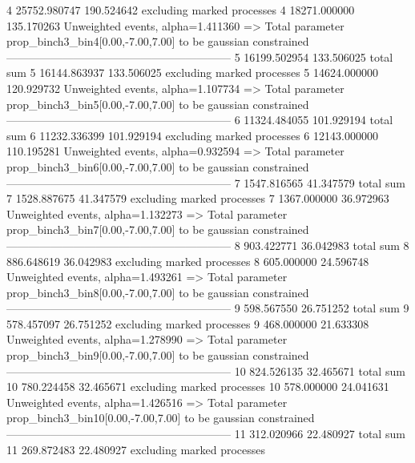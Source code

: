 4          25752.980747    190.524642      excluding marked processes    
4          18271.000000    135.170263      Unweighted events, alpha=1.411360
  => Total parameter prop_binch3_bin4[0.00,-7.00,7.00] to be gaussian constrained
------------------------------------------------------------
5          16199.502954    133.506025      total sum                     
5          16144.863937    133.506025      excluding marked processes    
5          14624.000000    120.929732      Unweighted events, alpha=1.107734
  => Total parameter prop_binch3_bin5[0.00,-7.00,7.00] to be gaussian constrained
------------------------------------------------------------
6          11324.484055    101.929194      total sum                     
6          11232.336399    101.929194      excluding marked processes    
6          12143.000000    110.195281      Unweighted events, alpha=0.932594
  => Total parameter prop_binch3_bin6[0.00,-7.00,7.00] to be gaussian constrained
------------------------------------------------------------
7          1547.816565     41.347579       total sum                     
7          1528.887675     41.347579       excluding marked processes    
7          1367.000000     36.972963       Unweighted events, alpha=1.132273
  => Total parameter prop_binch3_bin7[0.00,-7.00,7.00] to be gaussian constrained
------------------------------------------------------------
8          903.422771      36.042983       total sum                     
8          886.648619      36.042983       excluding marked processes    
8          605.000000      24.596748       Unweighted events, alpha=1.493261
  => Total parameter prop_binch3_bin8[0.00,-7.00,7.00] to be gaussian constrained
------------------------------------------------------------
9          598.567550      26.751252       total sum                     
9          578.457097      26.751252       excluding marked processes    
9          468.000000      21.633308       Unweighted events, alpha=1.278990
  => Total parameter prop_binch3_bin9[0.00,-7.00,7.00] to be gaussian constrained
------------------------------------------------------------
10         824.526135      32.465671       total sum                     
10         780.224458      32.465671       excluding marked processes    
10         578.000000      24.041631       Unweighted events, alpha=1.426516
  => Total parameter prop_binch3_bin10[0.00,-7.00,7.00] to be gaussian constrained
------------------------------------------------------------
11         312.020966      22.480927       total sum                     
11         269.872483      22.480927       excluding marked processes    
